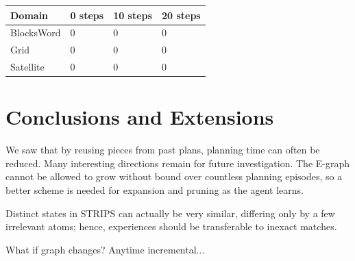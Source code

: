 \documentclass[letterpaper]{article}
\begin{document}
\begin{center}
    \begin{tabular}{| l | l | l | l |}
    \hline
    Domain & 0 steps & 10 steps & 20 steps
    \\ \hline
    BlocksWord & 0 & 0 & 0
    \\ \hline
    Grid & 0 & 0 & 0
    \\ \hline
    Satellite & 0 & 0 & 0
    \\ \hline
    \end{tabular}
\end{center}

\section{Conclusions and Extensions}

We saw that by reusing pieces from past plans, planning time can often be reduced. Many interesting directions remain for future investigation. The E-graph cannot be allowed to grow without bound over countless planning episodes, so a better scheme is needed for expansion and pruning as the agent learns.

Distinct states in STRIPS can actually be very similar, differing only by a few irrelevant atoms; hence, experiences should be transferable to inexact matches.

What if graph changes? Anytime incremental...



\end{document}
